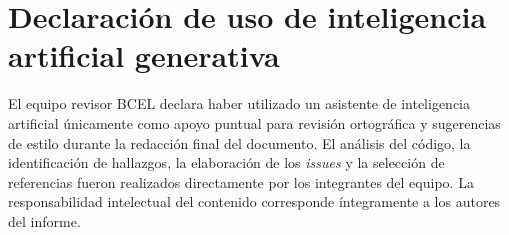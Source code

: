 \documentclass[11pt,a4paper]{article}
\begin{document}
\section{Declaración de uso de inteligencia artificial generativa}

El equipo revisor BCEL declara haber utilizado un asistente de inteligencia
artificial únicamente como apoyo puntual para revisión ortográfica y
sugerencias de estilo durante la redacción final del documento. El análisis
del código, la identificación de hallazgos, la elaboración de los
\emph{issues} y la selección de referencias fueron realizados directamente
por los integrantes del equipo. La responsabilidad intelectual del contenido
corresponde íntegramente a los autores del informe.

\nocite{*}


\end{document}
